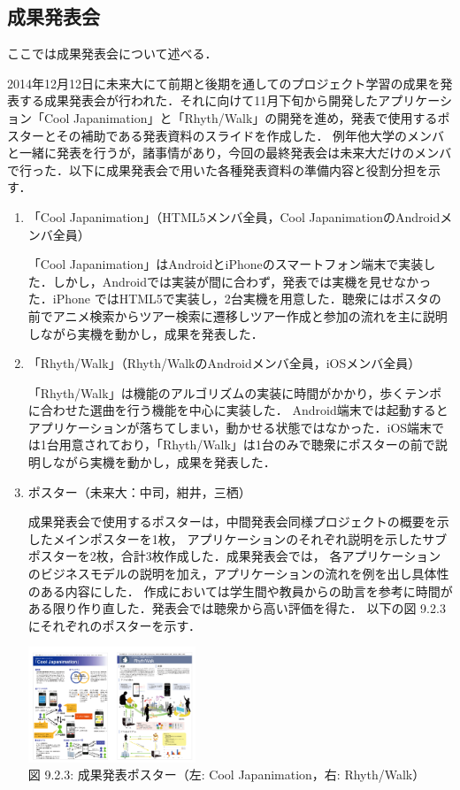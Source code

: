 \subsection{成果発表会}
\par
ここでは成果発表会について述べる．
\par
 2014年12月12日に未来大にて前期と後期を通してのプロジェクト学習の成果を発表する成果発表会が行われた．それに向けて11月下旬から開発したアプリケーション「Cool Japanimation」と「Rhyth/Walk」の開発を進め，発表で使用するポスターとその補助である発表資料のスライドを作成した．
例年他大学のメンバと一緒に発表を行うが，諸事情があり，今回の最終発表会は未来大だけのメンバで行った．以下に成果発表会で用いた各種発表資料の準備内容と役割分担を示す．
\begin{enumerate}
\item 「Cool Japanimation」（HTML5メンバ全員，Cool JapanimationのAndroidメンバ全員）
\par
 「Cool Japanimation」はAndroidとiPhoneのスマートフォン端末で実装した．しかし，Androidでは実装が間に合わず，発表では実機を見せなかった．iPhone ではHTML5で実装し，2台実機を用意した．聴衆にはポスタの前でアニメ検索からツアー検索に遷移しツアー作成と参加の流れを主に説明しながら実機を動かし，成果を発表した．
\par
\item 「Rhyth/Walk」（Rhyth/WalkのAndroidメンバ全員，iOSメンバ全員）
\par
 「Rhyth/Walk」は機能のアルゴリズムの実装に時間がかかり，歩くテンポに合わせた選曲を行う機能を中心に実装した． Android端末では起動するとアプリケーションが落ちてしまい，動かせる状態ではなかった．iOS端末では1台用意されており，「Rhyth/Walk」は1台のみで聴衆にポスターの前で説明しながら実機を動かし，成果を発表した．


\item ポスター（未来大：中司，紺井，三栖）
\par
 成果発表会で使用するポスターは，中間発表会同様プロジェクトの概要を示したメインポスターを1枚，
 アプリケーションのそれぞれ説明を示したサブポスターを2枚，合計3枚作成した．成果発表会では，
 各アプリケーションのビジネスモデルの説明を加え，アプリケーションの流れを例を出し具体性のある内容にした．
 作成においては学生間や教員からの助言を参考に時間がある限り作り直した．発表会では聴衆から高い評価を得た．
 以下の図 9.2.3にそれぞれのポスターを示す．
 \begin{center}
  \includegraphics[width=5cm]{poster.png} \\
  図 9.2.3: 成果発表ポスター（左: Cool Japanimation，右: Rhyth/Walk）
\end{center}


\end{enumerate}
